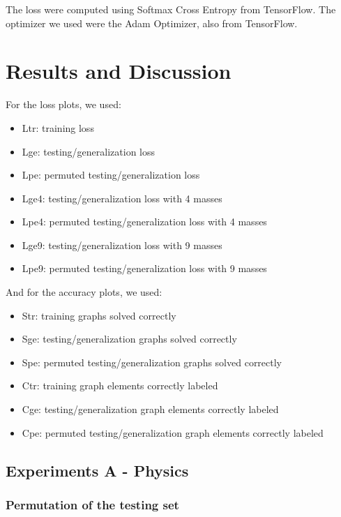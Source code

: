 The loss were computed using Softmax Cross Entropy from TensorFlow. The optimizer we used were the Adam Optimizer, also from TensorFlow.

\section{Results and Discussion}

For the loss plots, we used:

    \begin{itemize}
        \item Ltr: training loss
        \item Lge: testing/generalization loss
        \item Lpe: permuted testing/generalization loss
        \item Lge4: testing/generalization loss with 4 masses
        \item Lpe4: permuted testing/generalization loss with 4 masses
        \item Lge9: testing/generalization loss with 9 masses
        \item Lpe9: permuted testing/generalization loss with 9 masses
    \end{itemize}
    
And for the accuracy plots, we used:

    \begin{itemize}
        \item Str: training graphs solved correctly
        \item Sge: testing/generalization graphs solved correctly
        \item Spe: permuted testing/generalization graphs solved correctly
        \item Ctr: training graph elements correctly labeled
        \item Cge: testing/generalization graph elements correctly labeled
        \item Cpe: permuted testing/generalization graph elements correctly labeled
    \end{itemize}

\subsection{Experiments A - Physics}

\subsubsection {Permutation of the testing set}

